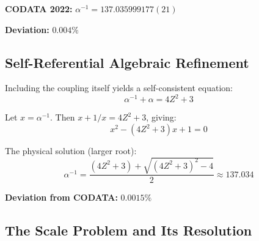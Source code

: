 \documentclass[12pt,a4paper]{article}
\newcommand{\Zsq}{Z^2}
\begin{document}
\textbf{CODATA 2022:} $\alpha^{-1} = 137.035999177(21)$

\textbf{Deviation:} $0.004\%$

\subsection{Self-Referential Algebraic Refinement}

Including the coupling itself yields a self-consistent equation:
\begin{equation}
\alpha^{-1} + \alpha = 4\Zsq + 3
\end{equation}

Let $x = \alpha^{-1}$. Then $x + 1/x = 4\Zsq + 3$, giving:
\begin{equation}
x^2 - (4\Zsq + 3)x + 1 = 0
\end{equation}

The physical solution (larger root):
\begin{equation}
\alpha^{-1} = \frac{(4\Zsq + 3) + \sqrt{(4\Zsq + 3)^2 - 4}}{2} \approx 137.034
\end{equation}

\textbf{Deviation from CODATA:} $0.0015\%$

\subsection{The Scale Problem and Its Resolution}
\end{document}
